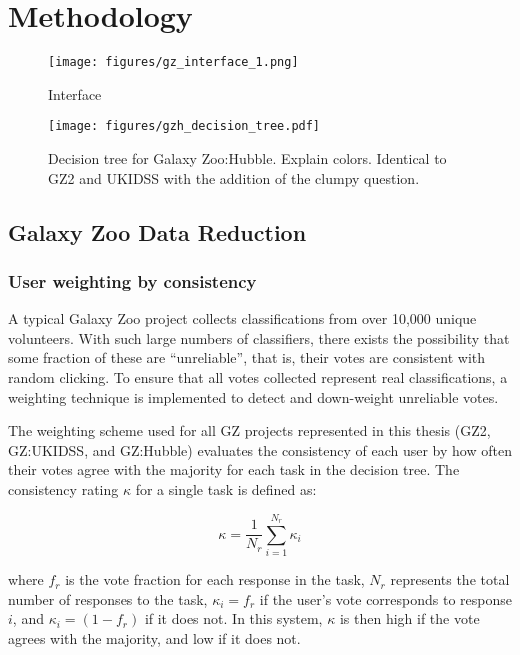\chapter{Methodology}
\label{chap:methodology}

\begin{figure}
\centering
\texttt{[image: figures/gz\_interface\_1.png]}
\caption{Interface}
\end{figure}

\begin{figure}
\centering
\texttt{[image: figures/gzh\_decision\_tree.pdf]}
\caption{Decision tree for Galaxy Zoo:Hubble. Explain colors. Identical to GZ2 and UKIDSS with the addition of the clumpy question.}
\end{figure}

\section{Galaxy Zoo Data Reduction}
\subsection{User weighting by consistency}
A typical Galaxy Zoo project collects classifications from over 10,000 unique volunteers. With such large numbers of classifiers, there exists the possibility that some fraction of these are ``unreliable'', that is, their votes are consistent with random clicking. To ensure that all votes collected represent real classifications, a weighting technique is implemented to detect and down-weight unreliable votes.

The weighting scheme used for all GZ projects represented in this thesis (GZ2, GZ:UKIDSS, and GZ:Hubble) evaluates the consistency of each user by how often their votes agree with the majority for each task in the decision tree. The consistency rating $\kappa$ for a single task is defined as:

\begin{equation}
\kappa = \frac{1}{N_{r}}\sum_{i=1}^{N_{r}}{\kappa_{i}}
\label{eqn:kappa}
\end{equation}

where $f_{r}$ is the vote fraction for each response in the task, $N_{r}$ represents the total number of responses to the task, $\kappa_{i} = f_{r}$ if the user's vote corresponds to response $i$, and $\kappa_{i} = (1-f_{r})$ if it does not. In this system, $\kappa$ is then high if the vote agrees with the majority, and low if it does not. 

